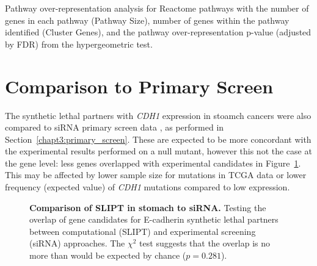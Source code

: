 \begin{table}[!hp]
{\begin{threeparttable}
\begin{tabular}{lccc}
 \hline
\end{tabular}
\begin{tablenotes}
\raggedright %
Pathway over-representation analysis for Reactome pathways with the number of genes in each pathway (Pathway Size), number of genes within the pathway identified (Cluster Genes), and the pathway over-representation p-value (adjusted by \gls{FDR}) from the hypergeometric test.  
\end{tablenotes}
\end{threeparttable}
}
\end{table}


\FloatBarrier

\section{Comparison to Primary Screen} \label{appendix:compare_exprSL_genes_stad}

The synthetic lethal partners with \textit{CDH1} expression in stoamch cancers were also compared to \gls{siRNA} primary screen data \citep{Telford2015}, as performed in Section~\ref{chapt3:primary_screen}. These are expected to be more concordant with the experimental results performed on a null mutant, however this not the case at the gene level: less genes overlapped with experimental candidates in Figure~\ref{fig:Venn_allgenes_stad}. This may be affected by lower sample size for mutations in \gls{TCGA} data or lower frequency (expected value) of \textit{CDH1} mutations compared to low expression. 



\begin{figure}[!ht]
  \centering
    \caption[Comparison of SLIPT in stomach to \gls{siRNA}]{\small \textbf{Comparison of SLIPT in stomach to \gls{siRNA}.} Testing the overlap of gene candidates for \gls{E-cadherin} synthetic lethal partners between computational (SLIPT) and experimental screening (siRNA) approaches. The $\chi^2$ test suggests that the overlap is no more than would be expected by chance ($p = 0.281$). %
}
\label{fig:Venn_allgenes_stad}
\end{figure}

